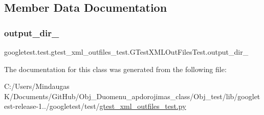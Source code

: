 \subsection{Member Data Documentation}
\mbox{\label{classgoogletest_1_1test_1_1gtest__xml__outfiles__test_1_1_g_test_x_m_l_out_files_test_a0a622880c735dfd26f2450fd617a454a}} 
\subsubsection{\texorpdfstring{output\_dir\_}{output\_dir\_}}
{\footnotesize\ttfamily googletest.\+test.\+gtest\+\_\+xml\+\_\+outfiles\+\_\+test.\+G\+Test\+X\+M\+L\+Out\+Files\+Test.\+output\+\_\+dir\+\_\+}



The documentation for this class was generated from the following file\+:\begin{DoxyCompactItemize}
\item 
C\+:/\+Users/\+Mindaugas K/\+Documents/\+Git\+Hub/\+Obj\+\_\+\+Duomenu\+\_\+apdorojimas\+\_\+class/\+Obj\+\_\+test/lib/googletest-\/release-\/1../googletest/test/\mbox{\hyperlink{_obj__test_2lib_2googletest-release-1_88_81_2googletest_2test_2gtest__xml__outfiles__test_8py}{gtest\+\_\+xml\+\_\+outfiles\+\_\+test.\+py}}\end{DoxyCompactItemize}
